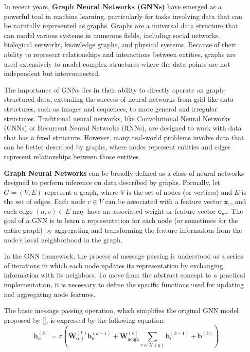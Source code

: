 In recent years, \textbf{Graph Neural Networks (GNNs)} have emerged as a powerful tool in machine learning, particularly for tasks involving data that can be naturally represented as graphs. Graphs are a universal data structure that can model various systems in numerous fields, including social networks, biological networks, knowledge graphs, and physical systems. Because of their ability to represent relationships and interactions between entities, graphs are used extensively to model complex structures where the data points are not independent but interconnected.

The importance of GNNs lies in their ability to directly operate on graph-structured data, extending the success of neural networks from grid-like data structures, such as images and sequences, to more general and irregular structures. Traditional neural networks, like Convolutional Neural Networks (CNNs) or Recurrent Neural Networks (RNNs), are designed to work with data that has a fixed structure. However, many real-world problems involve data that can be better described by graphs, where nodes represent entities and edges represent relationships between those entities. 


\textbf{Graph Neural Networks} can be broadly defined as a class of neural networks designed to perform inference on data described by graphs. Formally, let $G = (V, E)$ represent a graph, where $V$ is the set of nodes (or vertices) and $E$ is the set of edges. Each node $v \in V$ can be associated with a feature vector $\mathbf{x}_v$, and each edge $(u, v) \in E$ may have an associated weight or feature vector $\mathbf{e}_{uv}$. The goal of a GNN is to learn a representation for each node (or sometimes for the entire graph) by aggregating and transforming the feature information from the node's local neighborhood in the graph.


In the GNN framework, the process of message passing is understood as a series of iterations in which each node updates its representation by exchanging information with its neighbors. To move from the abstract concept to a practical implementation, it is necessary to define the specific functions used for updating and aggregating node features.

The basic message passing operation, which simplifies the original GNN model proposed by [], is expressed by the following equation:
\[
\mathbf{h}_u^{(k)} = \sigma\left( \mathbf{W}_{\text{self}}^{(k)} \mathbf{h}_u^{(k-1)} + \mathbf{W}_{\text{neigh}}^{(k)} \sum_{v \in \mathcal{N}(u)} \mathbf{h}_v^{(k-1)} + \mathbf{b}^{(k)} \right)
\]

